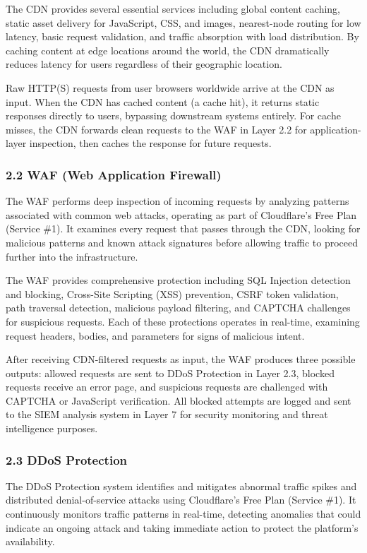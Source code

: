 \documentclass[12pt,a4paper]{report}
\begin{document}
The CDN provides several essential services including global content caching, static asset delivery for JavaScript, CSS, and images, nearest-node routing for low latency, basic request validation, and traffic absorption with load distribution. By caching content at edge locations around the world, the CDN dramatically reduces latency for users regardless of their geographic location.

Raw HTTP(S) requests from user browsers worldwide arrive at the CDN as input. When the CDN has cached content (a cache hit), it returns static responses directly to users, bypassing downstream systems entirely. For cache misses, the CDN forwards clean requests to the WAF in Layer 2.2 for application-layer inspection, then caches the response for future requests.

\subsubsection{2.2 WAF (Web Application Firewall)}

The WAF performs deep inspection of incoming requests by analyzing patterns associated with common web attacks, operating as part of Cloudflare's Free Plan (Service \#1). It examines every request that passes through the CDN, looking for malicious patterns and known attack signatures before allowing traffic to proceed further into the infrastructure.

The WAF provides comprehensive protection including SQL Injection detection and blocking, Cross-Site Scripting (XSS) prevention, CSRF token validation, path traversal detection, malicious payload filtering, and CAPTCHA challenges for suspicious requests. Each of these protections operates in real-time, examining request headers, bodies, and parameters for signs of malicious intent.

After receiving CDN-filtered requests as input, the WAF produces three possible outputs: allowed requests are sent to DDoS Protection in Layer 2.3, blocked requests receive an error page, and suspicious requests are challenged with CAPTCHA or JavaScript verification. All blocked attempts are logged and sent to the SIEM analysis system in Layer 7 for security monitoring and threat intelligence purposes.

\subsubsection{2.3 DDoS Protection}

The DDoS Protection system identifies and mitigates abnormal traffic spikes and distributed denial-of-service attacks using Cloudflare's Free Plan (Service \#1). It continuously monitors traffic patterns in real-time, detecting anomalies that could indicate an ongoing attack and taking immediate action to protect the platform's availability.
\end{document}
